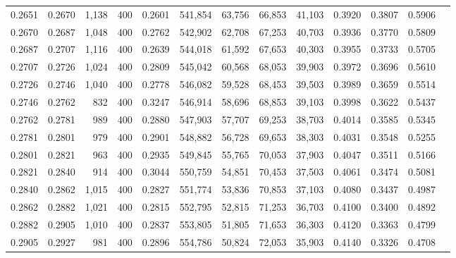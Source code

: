 \begin{tabular}{rrrrrrrrrrrrr}
0.2651 & 0.2670 &  1,138 & 400 &                                     0.2601 & 541,854 &  63,756 &  66,853 &  41,103 & 0.3920 & 0.3807 & 0.5906 \\
0.2670 & 0.2687 &  1,048 & 400 &                                     0.2762 & 542,902 &  62,708 &  67,253 &  40,703 & 0.3936 & 0.3770 & 0.5809 \\
0.2687 & 0.2707 &  1,116 & 400 &                                     0.2639 & 544,018 &  61,592 &  67,653 &  40,303 & 0.3955 & 0.3733 & 0.5705 \\
0.2707 & 0.2726 &  1,024 & 400 &                                     0.2809 & 545,042 &  60,568 &  68,053 &  39,903 & 0.3972 & 0.3696 & 0.5610 \\
0.2726 & 0.2746 &  1,040 & 400 &                                     0.2778 & 546,082 &  59,528 &  68,453 &  39,503 & 0.3989 & 0.3659 & 0.5514 \\
0.2746 & 0.2762 &    832 & 400 &                                     0.3247 & 546,914 &  58,696 &  68,853 &  39,103 & 0.3998 & 0.3622 & 0.5437 \\
0.2762 & 0.2781 &    989 & 400 &                                     0.2880 & 547,903 &  57,707 &  69,253 &  38,703 & 0.4014 & 0.3585 & 0.5345 \\
0.2781 & 0.2801 &    979 & 400 &                                     0.2901 & 548,882 &  56,728 &  69,653 &  38,303 & 0.4031 & 0.3548 & 0.5255 \\
0.2801 & 0.2821 &    963 & 400 &                                     0.2935 & 549,845 &  55,765 &  70,053 &  37,903 & 0.4047 & 0.3511 & 0.5166 \\
0.2821 & 0.2840 &    914 & 400 &                                     0.3044 & 550,759 &  54,851 &  70,453 &  37,503 & 0.4061 & 0.3474 & 0.5081 \\
0.2840 & 0.2862 &  1,015 & 400 &                                     0.2827 & 551,774 &  53,836 &  70,853 &  37,103 & 0.4080 & 0.3437 & 0.4987 \\
0.2862 & 0.2882 &  1,021 & 400 &                                     0.2815 & 552,795 &  52,815 &  71,253 &  36,703 & 0.4100 & 0.3400 & 0.4892 \\
0.2882 & 0.2905 &  1,010 & 400 &                                     0.2837 & 553,805 &  51,805 &  71,653 &  36,303 & 0.4120 & 0.3363 & 0.4799 \\
0.2905 & 0.2927 &    981 & 400 &                                     0.2896 & 554,786 &  50,824 &  72,053 &  35,903 & 0.4140 & 0.3326 & 0.4708 \\

\end{tabular}
